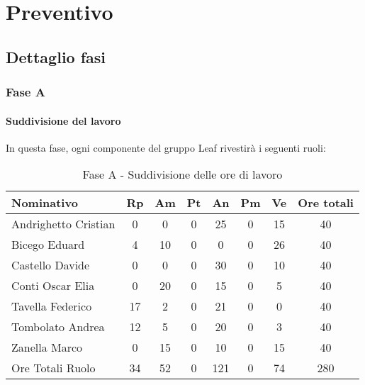 \documentclass[../PianoProgetto.tex]{subfiles}
\begin{document}
	\section{Preventivo}
		\subsection{Dettaglio fasi}
			\subsubsection{Fase A}
				\paragraph{Suddivisione del lavoro}
					In questa fase, ogni componente del gruppo Leaf rivestirà i seguenti ruoli:
	
					\begin{table}[h]
		\centering
	
		\begin{tabular}{l * {7}{c}}
			\toprule
			Nominativo & Rp & Am & Pt & An & Pm & Ve & Ore totali \\
			\midrule
			Andrighetto Cristian & 0 & 0 &	0 &	25 & 0 & 15 & 40 \\
			\midrule
			Bicego Eduard & 4 & 10 & 0 & 0 & 0 & 26 & 40 \\
			\midrule
			Castello Davide &	0 &	0 &	0 &	30 & 0 &	10 & 40 \\
			\midrule
			Conti Oscar Elia & 0 & 20 &	0 &	15 & 0 & 5 & 40 \\
			\midrule
			Tavella Federico &	17 & 2 & 0 & 21 & 0 & 0 & 40 \\
			\midrule
			Tombolato Andrea & 12 & 5 &	0 &	20 & 0 & 3 & 40 \\
			\midrule
			Zanella Marco & 0 & 15 & 0 & 10 & 0 & 15 & 40 \\
			\midrule			
			Ore Totali Ruolo & 34 & 52 & 0 & 121 &	0 &	74 & 280 \\
			\bottomrule
			
		\end{tabular}
		
		\caption{Fase A - Suddivisione delle ore di lavoro}
		\label{tab:faseA_ore}
		
	\end{table}
	
\end{document}
